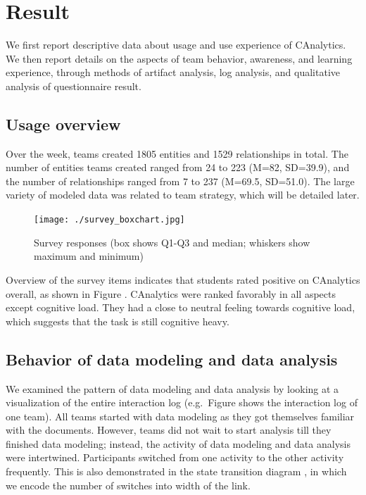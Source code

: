 \documentclass[]{article}
\date{}
\begin{document}
\section{Result}\label{result}

We first report descriptive data about usage and use experience of
CAnalytics. We then report details on the aspects of team behavior,
awareness, and learning experience, through methods of artifact
analysis, log analysis, and qualitative analysis of questionnaire
result.

\subsection{Usage overview}\label{usage-overview}

Over the week, teams created 1805 entities and 1529 relationships in
total. The number of entities teams created ranged from 24 to 223 (M=82,
SD=39.9), and the number of relationships ranged from 7 to 237 (M=69.5,
SD=51.0). The large variety of modeled data was related to team
strategy, which will be detailed later.

\begin{figure}
\centering
\texttt{[image: ./survey\_boxchart.jpg]}
\caption{Survey responses (box shows Q1-Q3 and median; whiskers show
maximum and minimum)}\label{fig:survey}
\end{figure}

Overview of the survey items indicates that students rated positive on
CAnalytics overall, as shown in Figure \autocite{fig:survey}. CAnalytics
were ranked favorably in all aspects except cognitive load. They had a
close to neutral feeling towards cognitive load, which suggests that the
task is still cognitive heavy.

\subsection{Behavior of data modeling and data
analysis}\label{behavior-of-data-modeling-and-data-analysis}

We examined the pattern of data modeling and data analysis by looking at
a visualization of the entire interaction log (e.g.~Figure
\autocite{fig:sequence} shows the interaction log of one team). All
teams started with data modeling as they got themselves familiar with
the documents. However, teams did not wait to start analysis till they
finished data modeling; instead, the activity of data modeling and data
analysis were intertwined. Participants switched from one activity to
the other activity frequently. This is also demonstrated in the state
transition diagram \autocite{fig:transition}, in which we encode the
number of switches into width of the link.
\end{document}
